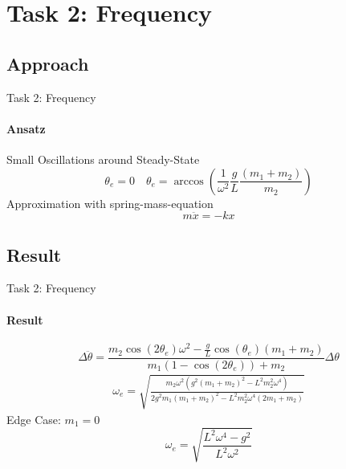 \section{Task 2: Frequency}
\subsection{Approach}
\begin{frame}{Task 2: Frequency}
	\framesubtitle{Ansatz}
	\begin{center}
		Small Oscillations around Steady-State
		\begin{equation*}
			\theta_e = 0 \quad \theta_e = \arccos\left(\frac{1}{\omega^2}\frac{g}{L}\frac{(m_1+m_2)}{m_2}\right)
		\end{equation*}
		Approximation with spring-mass-equation
		\begin{equation*}
			m\ddot{x} = -kx
		\end{equation*}
	\end{center}
\end{frame}


\subsection{Result}
\begin{frame}{Task 2: Frequency}
	\framesubtitle{Result}
	\begin{center}
		\begin{equation*}
			\Delta \ddot{\theta} = \frac{m_2\cos(2\theta_e)\omega^2 - \frac{g}{L}\cos(\theta_e)(m_1+m_2)}{m_1(1-\cos(2\theta_e))+m_2}\Delta \theta
		\end{equation*}
		\begin{align*}
			\omega_e =
			\sqrt{\frac{m_2\omega^2(g^2(m_1 + m_2)^2-L^2m_2^2\omega^4)}{2g^2m_1(m_1+m_2)^2-L^2m_2^2\omega^4(2m_1+m_2)}} 
		\end{align*}
		Edge Case: $m_1 = 0$
		\begin{equation*}
			\omega_e = \sqrt{\frac{L^2\omega^4 - g^2}{L^2\omega^2}}
		\end{equation*}
	\end{center}
\end{frame}

